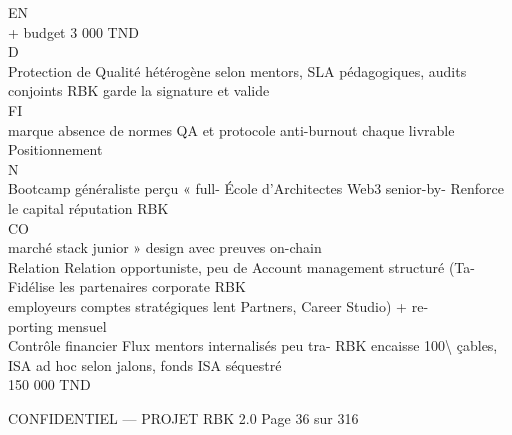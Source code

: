 \documentclass[12pt,landscape,a4paper]{article}
\newenvironment{confidential}
{\begin{tcolorbox}[
    colback=rbkred!5!white,
    colframe=rbkred!75!black,
    title=CONFIDENTIEL,
    fonttitle=\bfseries\color{white},
    coltitle=rbkred!75!black,
    breakable,
    enhanced,
    frame hidden,
    borderline west={2pt}{0pt}{rbkred!75!black}
]}
{\end{tcolorbox}}
\begin{document}
\vspace{0.5em}
\vspace{0.5em}
EN\\
+ budget 3 000 TND\\
\vspace{0.5em}
\vspace{0.5em}
\vspace{0.5em}
\vspace{0.5em}
D\\
Protection de        Qualité hétérogène selon mentors, SLA pédagogiques, audits conjoints RBK garde la signature et valide\\
\vspace{0.5em}
\vspace{0.5em}
\vspace{0.5em}
\vspace{0.5em}
FI\\
marque               absence de normes QA              et protocole anti-burnout          chaque livrable\\
Positionnement\\
N\\
Bootcamp généraliste perçu « full- École d’Architectes Web3 senior-by- Renforce le capital réputation RBK\\
CO\\
marché               stack junior »                     design avec preuves on-chain\\
Relation             Relation opportuniste,    peu   de Account management structuré (Ta- Fidélise les partenaires corporate RBK\\
employeurs           comptes stratégiques               lent Partners, Career Studio) + re-\\
porting mensuel\\
Contrôle financier   Flux mentors internalisés peu tra- RBK encaisse 100\textbackslash{}%
çables, ISA ad hoc                 selon jalons, fonds ISA séquestré\\
150 000 TND\\
\vspace{0.5em}
\vspace{0.5em}
\vspace{0.5em}
\vspace{0.5em}
\begin{confidential}CONFIDENTIEL — PROJET RBK 2.0                               Page 36 sur 316\end{confidential}
\end{document}
